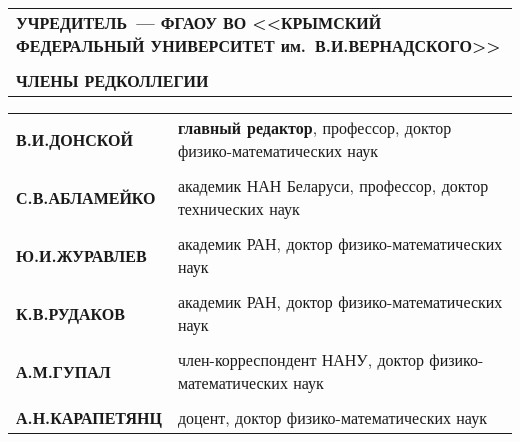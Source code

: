 \def\baselinestretch{1}
\thispagestyle{empty}

\myinter=2pt

\parindent=0mm
{\scriptsize\sf
    \renewcommand{\arraystretch}{0}
    \begin{tabular}{l}
        \textbf{УЧРЕДИТЕЛЬ~--- ФГАОУ ВО <<КРЫМСКИЙ ФЕДЕРАЛЬНЫЙ УНИВЕРСИТЕТ им.~В.\;И.\;ВЕРНАДСКОГО>>}\\
        
        \rule{0pt}{0.6cm}\\%
        \textbf{ЧЛЕНЫ РЕДКОЛЛЕГИИ}\\
    \end{tabular}
}

\vspace{0.3cm} {\renewcommand{\arraystretch}{0.4}
\begin{tabular}{ll}
{\qquad\scriptsize\sf \textbf{В.\;И.\;ДОНСКОЙ}}        & {\scriptsize\sf \textbf{главный редактор}, профессор, доктор физико-математических наук}\\

\rule{0pt}{4pt} & \\
{\qquad\scriptsize\sf \textbf{С.\;В.\;АБЛАМЕЙКО}}   & {\scriptsize\sf академик НАН Беларуси, профессор, доктор технических наук}\\

\rule{0pt}{4pt} & \\
{\qquad\scriptsize\sf \textbf{Ю.\;И.\;ЖУРАВЛЕВ}}       & {\scriptsize\sf академик РАН, доктор физико-математических наук}\\

\rule{0pt}{4pt} & \\
{\qquad\scriptsize\sf \textbf{К.\;В.\;РУДАКОВ}}        & {\scriptsize\sf академик РАН, доктор физико-математических наук}\\

\rule{0pt}{4pt} & \\
{\qquad\scriptsize\sf \textbf{А.\;М.\;ГУПАЛ}}          & {\scriptsize\sf член-корреспондент НАНУ, доктор физико-математических наук}\\

\rule{0pt}{4pt} & \\
{\qquad\scriptsize\sf \textbf{А.\;Н.\;КАРАПЕТЯНЦ}}     & {\scriptsize\sf доцент, доктор физико-математических наук}\\


\end{tabular}}
